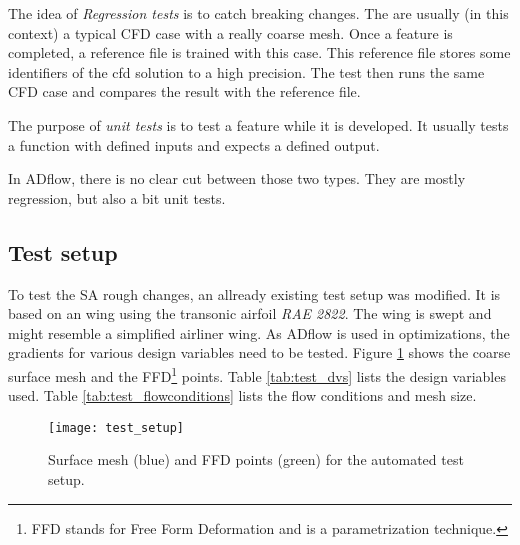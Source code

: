 The idea of \textit{Regression tests} is to catch breaking changes. The are
usually (in this context) a typical CFD case with a really coarse mesh. Once a
feature is completed, a reference file is trained with this case. This reference
file stores some identifiers of the cfd solution to a high precision. The test
then runs the same CFD case and compares the result with the reference
file.

The purpose of \textit{unit tests} is to test a feature while it is developed.
It usually tests a function with defined inputs and expects a defined output.

In ADflow, there is no clear cut between those two types. They are mostly
regression, but also a bit unit tests.

\subsection{Test setup}
To test the SA rough changes, an allready existing test setup was modified. It
is based on an wing using the transonic airfoil \textit{RAE 2822}. The wing is
swept and might resemble a simplified airliner wing. As ADflow is used in
optimizations, the gradients for various design variables need to be tested.
Figure \ref{fig:test_setup} shows the coarse surface mesh and the
FFD\footnote{FFD stands for Free Form Deformation and is a parametrization
technique.} points. Table \ref{tab:test_dvs} lists the design variables used.
Table \ref{tab:test_flowconditions} lists the flow conditions and mesh size.

\begin{figure}[H] \centering
  \texttt{[image: test\_setup]}
  \caption{Surface mesh (blue) and FFD points (green) for the automated test setup.}
  \label{fig:test_setup}
\end{figure}


